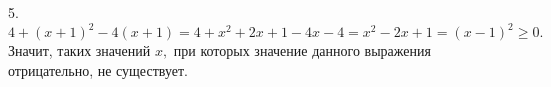 5. $4+(x+1)^2-4(x+1)=4+x^2+2x+1-4x-4=x^2-2x+1=(x-1)^2\geqslant0.$ Значит, таких значений $x,$ при которых значение данного выражения отрицательно, не существует.\\

